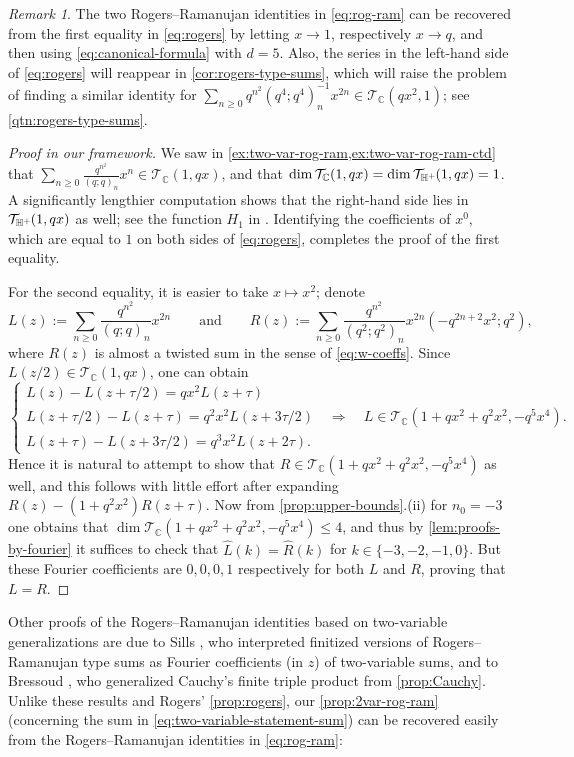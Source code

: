 \documentclass[reqno,11pt]{amsart}
\theoremstyle{definition}
\theoremstyle{remark}
\newtheorem*{remark}{Remark}
\numberwithin{equation}{section}
\newcommand{\C}{\mathbb{C}}
\newcommand{\Hplus}{{\mathbb{H}^{\textnormal{+}\hspace{-0.03cm}}}}
\newcommand{\mT}{\mathcal{T}}
\renewcommand{\hat}{\widehat}
\begin{document}
\begin{remark}
The two Rogers--Ramanujan identities in \cref{eq:rog-ram} can be recovered from the first equality in \cref{eq:rogers} by letting $x \to 1$, respectively $x \to q$, and then using \cref{eq:canonical-formula} with $d = 5$. Also, the series in the left-hand side of \cref{eq:rogers} will reappear in  \cref{cor:rogers-type-sums}, which will raise the problem of finding a similar identity for $\sum_{n \geq 0} q^{n^2} (q^4; q^4)_n^{-1} x^{2n} \in \mT_\C\left(qx^2, 1\right)$; see \cref{qtn:rogers-type-sums}.
\end{remark}
\begin{proof}[Proof in our framework]
We saw in \cref{ex:two-var-rog-ram,ex:two-var-rog-ram-ctd} that $\sum_{n \ge 0} \frac{q^{n^2}}{(q; q)_n} x^n \in \mT_\C(1, qx)$, and that $\dim \mT_\C(1, qx) = \dim \mT_\Hplus(1, qx) = 1$. A significantly lengthier computation shows that the right-hand side lies in $\mT_\Hplus(1, qx)$ as well; see the function $H_1$ in \cite[p.~292--294]{hardy1979introduction}. Identifying the coefficients of $x^0$, which are equal to $1$ on both sides of \cref{eq:rogers}, completes the proof of the first equality.

For the second equality, it is easier to take $x \mapsto x^2$; denote 
\[
    L(z) := \sum_{n \geq 0} \frac{q^{n^2}}{(q; q)_n} x^{2n}
    \qquad\text{and}\qquad  
    R(z) := \sum_{n \ge 0} 
    \frac{q^{n^2}}{\left(q^2; q^2\right)_n} x^{2n} \left(-q^{2n+2} x^2; q^2\right),
\]
where $R(z)$ is almost a twisted sum in the sense of \cref{eq:w-coeffs}. Since $L(z/2) \in \mT_\C(1, qx)$, one can obtain
\[
    \begin{cases}
    L(z) - L(z+\tau/2) = qx^2 L(z+\tau) \\
    L(z+\tau/2) - L(z+\tau) = q^2x^2 L(z+3\tau/2) 
    \quad \Rightarrow \quad 
    L \in \mT_\C\left(1 + qx^2 + q^2 x^2, -q^5 x^4\right).
    \\
    L(z+\tau) - L(z+3\tau/2) = q^3x^2 L(z+2\tau).
    \end{cases}
\]
Hence it is natural to attempt to show that $R \in \mT_\C\left(1 + qx^2 + q^2 x^2, -q^5 x^4\right)$ as well, and this follows with little effort after expanding $R(z) - \left(1 + q^2 x^2\right)R(z+\tau)$. Now from \cref{prop:upper-bounds}.(ii) for $n_0 = -3$ one obtains that $\dim \mT_\C\left(1 + qx^2 + q^2 x^2, -q^5 x^4\right) \le 4$, and thus by \cref{lem:proofs-by-fourier} it suffices to check that $\hat{L}(k) = \hat{R}(k)$ for $k \in \{-3, -2, -1, 0\}$. But these Fourier coefficients are $0, 0, 0, 1$ respectively for both $L$ and $R$, proving that $L = R$.
\end{proof}
Other proofs of the Rogers--Ramanujan identities based on two-variable generalizations are due to Sills \cite{sills2019finite}, who interpreted finitized versions of Rogers--Ramanujan type sums as Fourier coefficients (in $z$) of two-variable sums, and to Bressoud \cite{bressoud1983easy}, who generalized Cauchy's finite triple product from \cref{prop:Cauchy}. Unlike these results and Rogers' \cref{prop:rogers}, our \cref{prop:2var-rog-ram} (concerning the sum in \cref{eq:two-variable-statement-sum}) can be recovered easily from the Rogers--Ramanujan identities in \cref{eq:rog-ram}:
\end{document}
